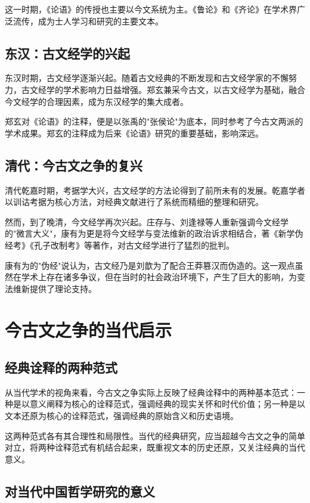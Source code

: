 \documentclass[12pt,a4paper]{article}
\begin{document}
这一时期，《论语》的传授也主要以今文系统为主。《鲁论》和《齐论》在学术界广泛流传，成为士人学习和研究的主要文本。

\subsection{东汉：古文经学的兴起}

东汉时期，古文经学逐渐兴起。随着古文经典的不断发现和古文经学家的不懈努力，古文经学的学术影响力日益增强。郑玄兼采今古文，以古文经学为基础，融合今文经学的合理因素，成为东汉经学的集大成者。

郑玄对《论语》的注释，便是以张禹的"张侯论"为底本，同时参考了今古文两派的学术成果。郑玄的注释成为后来《论语》研究的重要基础，影响深远。

\subsection{清代：今古文之争的复兴}

清代乾嘉时期，考据学大兴，古文经学的方法论得到了前所未有的发展。乾嘉学者以训诂考据为核心方法，对经典文献进行了系统而精细的整理和研究。

然而，到了晚清，今文经学再次兴起。庄存与、刘逢禄等人重新强调今文经学的"微言大义"，康有为更是将今文经学与变法维新的政治诉求相结合，著《新学伪经考》《孔子改制考》等著作，对古文经学进行了猛烈的批判。

康有为的"伪经"说认为，古文经乃是刘歆为了配合王莽篡汉而伪造的。这一观点虽然在学术上存在诸多争议，但在当时的社会政治环境下，产生了巨大的影响，为变法维新提供了理论支持。

\section{今古文之争的当代启示}

\subsection{经典诠释的两种范式}

从当代学术的视角来看，今古文之争实际上反映了经典诠释中的两种基本范式：一种是以意义阐释为核心的诠释范式，强调经典的现实关怀和时代价值；另一种是以文本还原为核心的诠释范式，强调经典的原始含义和历史语境。

这两种范式各有其合理性和局限性。当代的经典研究，应当超越今古文之争的简单对立，将两种诠释范式有机结合起来，既重视文本的历史还原，又关注经典的当代意义。

\subsection{对当代中国哲学研究的意义}
\end{document}
